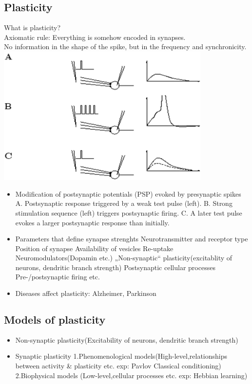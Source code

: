 \documentclass[english,11pt]{article}
\begin{document}
\subsection{Plasticity}
What is plasticity?\\
Axiomatic rule: Everything is somehow encoded in synapses.\\
No information in the shape of the spike, but in the frequency and synchronicity.\\
\includegraphics[width=0.8\textwidth]{plasticity.png}
\begin{itemize}
\item Modification of postsynaptic potentials (PSP) evoked by presynaptic spikes
\subitem A. Postsynaptic response triggered by a weak test pulse (left).
\subitem B. Strong stimulation sequence (left) triggers postsynaptic firing.
\subitem C. A later test pulse evokes a larger postsynaptic response than initially.
\item Parameters that define synapse strenghts
\subitem Neurotransmitter and receptor type
\subitem Position of synapse
\subitem Availability of vesicles
\subitem Re-uptake
\subitem Neuromodulators(Dopamin etc.)
\subitem „Non-synaptic“ plasticity(excitablity of neurons, dendritic branch strength)
\subitem Postsynaptic cellular processes
\subitem Pre-/postsynaptic firing
\subitem etc.
\item Diseases affect plasticity: Alzheimer, Parkinson
\end{itemize}

\subsection{Models of plasticity}
\begin{itemize}
\item Non-synaptic plasticity(Excitability of neurons, dendritic branch strength)
\item Synaptic plasticity
\subitem 1.Phenomenological models(High-level,relationships between activity \& plasticity etc. exp: Pavlov Classical conditioning)
\subitem 2.Biophysical models (Low-level,cellular processes etc. exp: Hebbian learning)
\end{itemize}
\end{document}
